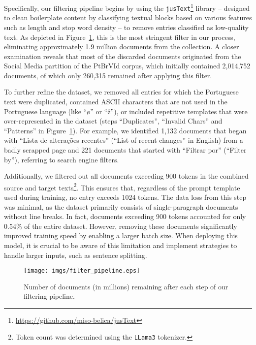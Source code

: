 Specifically, our filtering pipeline begins by using the \texttt{jusText}\footnote{\url{https://github.com/miso-belica/jusText}} library -- designed to clean boilerplate content by classifying textual blocks based on various features such as length and stop word density --  to remove entries classified as low-quality text. As depicted in Figure~\ref{fig:filter_pipeline}, this is the most stringent filter in our process, eliminating approximately 1.9 million documents from the collection. A closer examination reveals that most of the discarded documents originated from the Social Media partition of the PtBrVId corpus, which initially contained 2,014,752 documents, of which only 260,315 remained after applying this filter.

To further refine the dataset, we removed all entries for which the Portuguese text were duplicated, contained ASCII characters that are not used in the Portuguese language (like ``ø'' or ``ž''), or included repetitive templates that were over-represented in the dataset (steps ``Duplicates'', ``Invalid Chars'' and ``Patterns'' in Figure~\ref{fig:filter_pipeline}). For example, we identified 1,132 documents that began with ``Lista de alterações recentes'' (``List of recent changes'' in English) from a badly scrapped page and 221 documents that started with ``Filtrar por'' (``Filter by''), referring to search engine filters.

Additionally, we filtered out all documents exceeding 900 tokens in the combined source and target texts\footnote{Token count was determined using the \texttt{LLama3} tokenizer.}. This ensures that, regardless of the prompt template used during training, no entry exceeds 1024 tokens. The data loss from this step was minimal, as the dataset primarily consists of single-paragraph documents without line breaks. In fact, documents exceeding 900 tokens accounted for only 0.54\% of the entire dataset. However, removing these documents significantly improved training speed by enabling a larger batch size. When deploying this model, it is crucial to be aware of this limitation and implement strategies to handle larger inputs, such as sentence splitting.

\begin{figure}[htbp]
    \centering
    \texttt{[image: imgs/filter\_pipeline.eps]}
    \caption{Number of documents (in millions) remaining after each step of our filtering pipeline.}
    \label{fig:filter_pipeline}
\end{figure}

